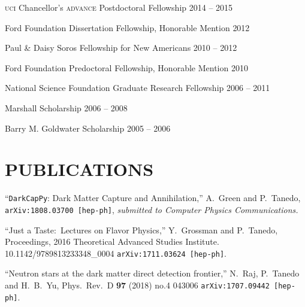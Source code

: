 \documentclass[margin,line]{resume}
\newcommand{\scap}[1]{\textsc{\MakeLowercase{#1}}}
\begin{document}
\begin{resume}
\scap{UCI} Chancellor's \scap{ADVANCE} Postdoctoral Fellowship%
\hfill%
\textsf{ 2014 -- 2015 }

\vspace{-3mm}


Ford Foundation Dissertation Fellowship, Honorable Mention 
\hfill%
\textsf{ 2012 }

\vspace{-3mm}


Paul \& Daisy Soros Fellowship for New Americans
\hfill%
\textsf{ 2010 -- 2012 }

\vspace{-3mm}

Ford Foundation Predoctoral Fellowship, Honorable Mention 
\hfill%
\textsf{ 2010 }

\vspace{-3mm}


National Science Foundation Graduate Research Fellowship
\hfill
\textsf{ 2006 -- 2011 }

\vspace{-3mm}


Marshall Scholarship
\hfill
\textsf{ 2006 -- 2008 }

\vspace{-3mm}


Barry M. Goldwater Scholarship
\hfill
\textsf{ 2005 -- 2006 }




\section{\footnotesize \sc
\sffamily 
{}PUBLICATIONS
}

``\texttt{DarkCapPy}: Dark Matter Capture and Annihilation,''
  A.~Green and P.~Tanedo,
  \texttt{arXiv:1808.03700 [hep-ph]}, \emph{submitted to Computer Physics Communications.}
\vspace{-2mm}

``Just a Taste:\ Lectures on Flavor Physics,''
  Y.~Grossman and P.~Tanedo,
 Proceedings, 2016 Theoretical Advanced Studies Institute.
  {\small 10.1142/9789813233348\_0004}
  \texttt{arXiv:1711.03624 [hep-ph]}.
\vspace{-2mm}

``Neutron stars at the dark matter direct detection frontier,''
  N.~Raj, P.~Tanedo and H.~B.~Yu,
  Phys.\ Rev.\ D {\bf 97} (2018) no.4 043006
\texttt{arXiv:1707.09442 [hep-ph]}.
\vspace{-2mm}


\end{resume}
\end{document}
